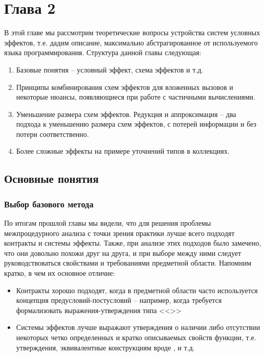 \section{Глава 2}

В этой главе мы рассмотрим теоретические вопросы устройства систем условных эффектов, т.е. дадим описание, максимально абстрагированное от используемого языка программирования. Структура данной главы следующая:

\begin{enumerate}
    \item Базовые понятия -- условный эффект, схема эффектов и т.д.
    
    \item Принципы комбинирования схем эффектов для вложенных вызовов и некоторые нюансы, появляющиеся при работе с частичными вычислениями.
    
    \item Уменьшение размера схем эффектов. Редукция и аппроксимация -- два подхода к уменьшению размера схем эффектов, с потерей информации и без потери соответственно.
    
    \item Более сложные эффекты на примере уточнений типов в коллекциях.
\end{enumerate}

\subsection{Основные понятия}

\subsubsection{Выбор базового метода}
По итогам прошлой главы мы видели, что для решения проблемы межпроцедурного анализа с точки зрения практики лучше всего подходят контракты и системы эффекты. Также, при анализе этих подходов было замечено, что они довольно похожи друг на друга, и при выборе между ними следует руководствоваться свойствами и требованиями предметной области. Напомним кратко, в чем их основное отличие:

\begin{itemize}
    \item Контракты хорошо подходят, когда в предметной области часто используется концепция предусловий-постусловий --  например, когда требуется формализовать выражения-утверждения типа <<>>

    \item Системы эффектов лучше выражают утверждения о наличии либо отсутствии некоторых четко определенных и кратко описываемых свойств функции, т.е. утверждения, эквивалентные конструкциям вроде ,  и т.д.

\end{itemize}

